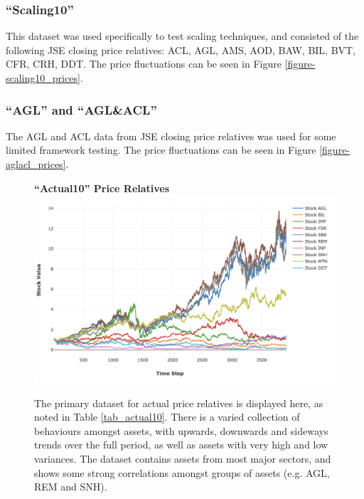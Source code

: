 \documentclass[a4paper,11pt,oneside]{article}
\theoremstyle{plain}
\theoremstyle{definition}
\begin{document}
	\subsubsection{``Scaling10''}\label{dataset_scaling10}
	
	 This dataset was used specifically to test scaling techniques, and consisted of the following JSE closing price relatives: ACL, AGL, AMS, AOD, BAW, BIL, BVT, CFR, CRH, DDT. The price fluctuations can be seen in Figure \ref{figure-scaling10_prices}.
	
	\subsubsection{``AGL'' and ``AGL\&ACL''}\label{dataset_agl}\label{dataset_aglacl}
	
	The AGL and ACL data from JSE closing price relatives was used for some limited framework testing. The price fluctuations can be seen in Figure \ref{figure-aglacl_prices}.
	
	\begin{figure}[H]
		\centering
		\textbf{``Actual10'' Price Relatives}
		\includegraphics[scale=0.45]{images/results/prices/actual10_prices.png} 
		\caption[``Actual10'' Price Relatives]{The primary dataset for actual price relatives is displayed here, as noted in Table \ref{tab_actual10}. There is a varied collection of behaviours amongst assets, with upwards, downwards and sideways trends over the full period, as well as assets with very high and low variances. The dataset contains assets from most major sectors, and shows some strong correlations amongst groups of assets (e.g. AGL, REM and SNH). }
		\label{figure-actual10_prices}
	\end{figure}
	
\end{document}
